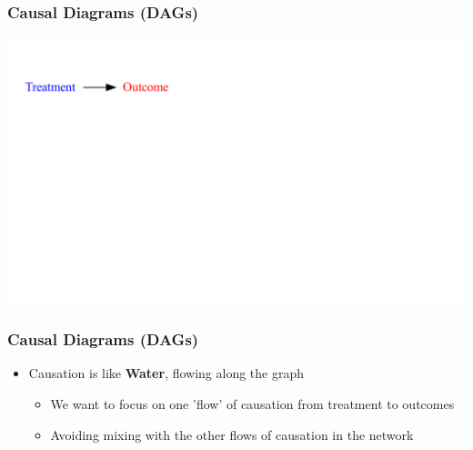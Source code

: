 \documentclass[xcolor=x11names,compress]{beamer}\usepackage[]{graphicx}\usepackage[]{color}
\newenvironment{knitrout}{}{} %
\renewcommand{\(}{\begin{columns}}
\renewcommand{\)}{\end{columns}}
\newcommand{\<}[1]{\begin{column}{#1}}
\renewcommand{\>}{\end{column}}
\begin{document}
\begin{frame}
\frametitle{Causal Diagrams (DAGs)}
\begin{knitrout}
\color{fgcolor}
\includegraphics[width=1.8\linewidth]{figure/Dag1-1} 

\end{knitrout}
\end{frame}

\begin{frame}
\frametitle{Causal Diagrams (DAGs)}
\begin{itemize}
\item Causation is like \textbf{Water}, flowing along the graph
\begin{itemize}
\item We want to focus on one 'flow' of causation from treatment to outcomes
\pause
\item Avoiding mixing with the other flows of causation in the network
\end{itemize}
\end{itemize}
\end{frame}
\end{document}
